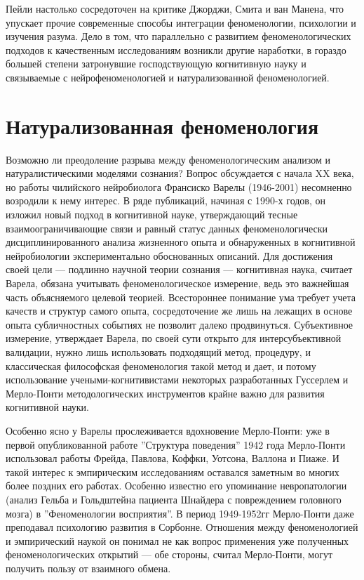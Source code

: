 \documentclass[11pt]{book}
\begin{document}
Пейли настолько сосредоточен на критике Джорджи, Смита и ван Манена, что упускает прочие современные способы интеграции феноменологии, психологии и изучения разума. Дело в том, что параллельно с развитием феноменологических подходов к качественным исследованиям возникли другие наработки, в гораздо большей степени затронувшие господствующую когнитивную науку и связываемые с нейрофеноменологией и натурализованной феноменологией.

\section{Натурализованная феноменология}

Возможно ли преодоление разрыва между феноменологическим анализом и натуралистическими моделями сознания? Вопрос обсуждается с начала XX века, но работы чилийского нейробиолога Франсиско Варелы (1946-2001) несомненно возродили к нему интерес. В ряде публикаций, начиная с 1990-х годов, он изложил новый подход в когнитивной науке, утверждающий тесные взаимоограничивающие связи и равный статус данных феноменологически дисциплинированного анализа жизненного опыта и обнаруженных в когнитивной нейробиологии экспериментально обоснованных описаний. Для достижения своей цели --- подлинно научной теории сознания --- когнитивная наука, считает Варела, обязана учитывать феноменологическое измерение, ведь это важнейшая часть объясняемого целевой теорией. Всестороннее понимание ума требует учета качеств и структур самого опыта, сосредоточение же лишь на лежащих в основе опыта субличностных событиях не позволит далеко продвинуться. Субъективное измерение, утверждает Варела, по своей сути открыто для интерсубъективной валидации, нужно лишь использовать подходящий метод, процедуру, и классическая философская феноменология такой метод и дает, и потому использование учеными-когнитивистами некоторых разработанных Гуссерлем и Мерло-Понти методологических инструментов крайне важно для развития когнитивной науки.

Особенно ясно у Варелы прослеживается вдохновение Мерло-Понти: уже в первой опубликованной работе ''Структура поведения'' 1942 года Мерло-Понти использовал работы Фрейда, Павлова, Коффки, Уотсона, Валлона и Пиаже. И такой интерес к эмпирическим исследованиям оставался заметным во многих более поздних его работах. Особенно известно его упоминание невропатологии (анализ Гельба и Гольдштейна пациента Шнайдера с повреждением головного мозга) в ''Феноменологии восприятия''. В период 1949-1952гг Мерло-Понти даже преподавал психологию развития в Сорбонне. Отношения между феноменологией и эмпирический наукой он понимал не как вопрос применения уже полученных феноменологических открытий --- обе стороны, считал Мерло-Понти, могут получить пользу от взаимного обмена.
\end{document}
